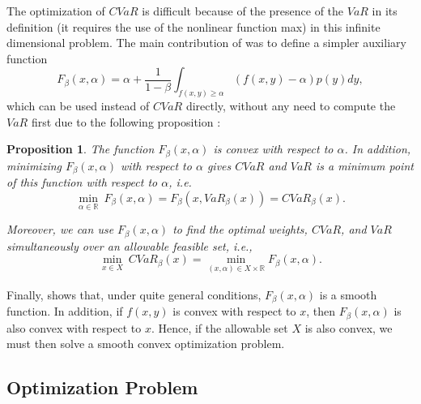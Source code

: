 \documentclass[a4paper,10pt]{article}
\newtheorem{mypro}{Proposition}
\begin{document}
The optimization of $CVaR$ is difficult because of the presence of the $VaR$ in its definition (it requires the use of the nonlinear function max) in this infinite dimensional problem. The main contribution of \citet*{rockafellar2000} was to define a simpler auxiliary function
\begin{equation}
F_{\beta }\left( x,\alpha \right) = \alpha +\frac{1}{1-\beta }%
\int_{f(x,y)\geq \alpha }\left( f(x,y)-\alpha \right) p(y)dy,
\label{six}
\end{equation}
which can be used instead of $CVaR$ directly, without any need to compute the $VaR$ first due to the following proposition \citep*{pflug2000}: 


\begin{mypro}
	The function $F_{\beta }\left( x,\alpha \right) $ is convex with respect to $%
	\alpha $. In addition, minimizing $F_{\beta }\left( x,\alpha \right) $ with
	respect to $\alpha $ gives $CVaR$ and $VaR$ is a minimum point of this
	function with respect to $\alpha $, i.e.
	\begin{equation}
	\underset{\alpha \in	\mathbb{R}	}{\min }~F_{\beta }\left( x,\alpha \right) =F_{\beta }\left( x,VaR_{\beta }\left( x\right) \right) =CVaR_{\beta }(x).  \label{seven}
	\end{equation}
	
	Moreover, we can use $F_{\beta }\left( x,\alpha \right) $ to find the optimal weights, $CVaR$, and
	$VaR$ simultaneously over an allowable feasible set, i.e.,
	\begin{equation}
	\underset{x\in X}{\min }~CVaR_{\beta }(x)=\underset{}{\underset{\left(x,\alpha \right) \in X\times \mathbb{R} }{\min }F_{\beta }\left( x,\alpha \right) }.  \label{eight}
	\end{equation}
	
\end{mypro}

Finally, \citet*{pflug2000} shows that, under quite general conditions, $F_{\beta}\left( x,\alpha \right) $ is a smooth function. In addition, if $f(x,y)$ is convex with respect to $x$, then $F_{\beta}\left( x,\alpha \right) $ is also convex with respect to $x$. Hence, if the allowable set $X$ is also convex, we must then solve a smooth convex optimization problem.

\subsection{Optimization Problem}
\end{document}
